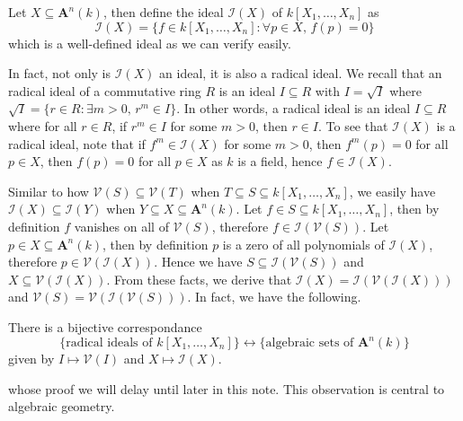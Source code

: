 \documentclass[11pt]{book}
\begin{document}
\begin{definition}Let $X\subseteq \mathbf A^n(k)$, then define the ideal $\mathcal{I}(X)$ of $k[X_1,\dots,X_n]$ as 
\[\mathcal{I}(X)=\{f\in k[X_1,\dots,X_n]:\forall p\in X,\,f(p)=0\}\]
which is a well-defined ideal as we can verify easily.
\end{definition}
In fact, not only is $\mathcal{I}(X)$ an ideal, it is also a radical ideal. We recall that an radical ideal of a commutative ring $R$ is an ideal $I\subseteq R$ with $I=\sqrt{I}$ where $\sqrt{I}=\{r\in R:\exists m>0,\, r^m\in I\}$. In other words, a radical ideal is an ideal $I\subseteq R$ where for all $r\in R$, if $r^m\in I$ for some $m>0$, then $r\in I$. To see that $\mathcal{I}(X)$ is a radical ideal, note that if $f^m\in \mathcal{I}(X)$ for some $m>0$, then $f^m(p)=0$ for all $p\in X$, then $f(p)=0$ for all $p\in X$ as $k$ is a field, hence $f\in \mathcal{I}(X)$. 

Similar to how $\mathcal{V}(S)\subseteq \mathcal{V}(T)$ when $T\subseteq S\subseteq k[X_1,\dots,X_n]$, we easily have $\mathcal{I}(X)\subseteq \mathcal{I}(Y)$ when $Y\subseteq X\subseteq \mathbf A^n(k)$. Let $f\in S\subseteq k[X_1,\dots,X_n]$, then by definition $f$ vanishes on all of $\mathcal{V}(S)$, therefore $f\in \mathcal{I}(\mathcal{V}(S))$. Let $p\in X\subseteq \mathbf A^n(k)$, then by definition $p$ is a zero of all polynomials of $\mathcal{I}(X)$, therefore $p\in \mathcal{V}(\mathcal{I}(X))$. Hence we have $S\subseteq \mathcal{I}(\mathcal{V}(S))$ and $X\subseteq \mathcal{V}(\mathcal{I}(X))$. From these facts, we derive that $\mathcal{I}(X)= \mathcal{I}(\mathcal{V}(\mathcal{I}(X)))$ and $\mathcal{V}(S)= \mathcal{V}(\mathcal{I}(\mathcal V(S)))$. In fact, we have the following.
\begin{theorembox}There is a bijective correspondance
\[\{\textrm{radical\ ideals\ of\ }k[X_1,\dots,X_n]\}\longleftrightarrow\{\textrm{algebraic\ sets\ of\ }\mathbf A^n(k)\}\]
given by $I\mapsto \mathcal{V}(I)$ and $X\mapsto \mathcal{I}(X)$.
\end{theorembox}
whose proof we will delay until later in this note. This observation is central to algebraic geometry. 
\end{document}
